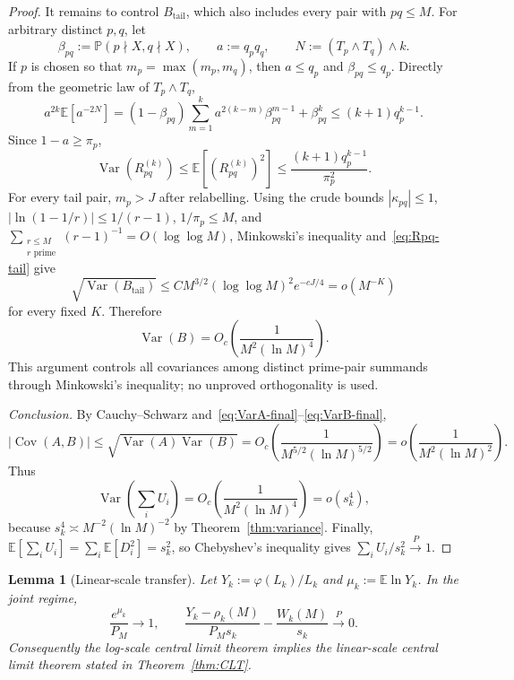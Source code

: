 \documentclass[11pt]{article}
\newtheorem{lemma}[theorem]{Lemma}
\theoremstyle{remark}
\newcommand{\PP}{\mathbb{P}}
\newcommand{\EE}{\mathbb{E}}
\DeclareMathOperator{\Var}{Var}
\DeclareMathOperator{\Cov}{Cov}
\begin{document}
\begin{proof}
It remains to control $B_{\mathrm{tail}}$, which also includes every pair with $pq\leq M$. For arbitrary distinct $p,q$, let
\[
\beta_{pq}:=\PP(p\nmid X,q\nmid X),\qquad a:=q_pq_q,
\qquad N:=(T_p\wedge T_q)\wedge k.
\]
If $p$ is chosen so that $m_p=\max(m_p,m_q)$, then $a\leq q_p$ and $\beta_{pq}\leq q_p$. Directly from the geometric law of $T_p\wedge T_q$,
\[
a^{2k}\EE[a^{-2N}]
=(1-\beta_{pq})\sum_{m=1}^k a^{2(k-m)}\beta_{pq}^{m-1}+\beta_{pq}^k
\leq (k+1)q_p^{k-1}.
\]
Since $1-a\geq\pi_p$,
\begin{equation}\label{eq:Rpq-tail}
\Var(R_{pq}^{(k)})
\leq \EE[(R_{pq}^{(k)})^2]
\leq \frac{(k+1)q_p^{k-1}}{\pi_p^2}.
\end{equation}
For every tail pair, $m_p>J$ after relabelling. Using the crude bounds $|\kappa_{pq}|\leq1$, $|\ln(1-1/r)|\leq1/(r-1)$, $1/\pi_p\leq M$, and $\sum_{\substack{r\leq M\\ r\text{ prime}}}(r-1)^{-1}=O(\log\log M)$, Minkowski's inequality and~\eqref{eq:Rpq-tail} give
\[
\sqrt{\Var(B_{\mathrm{tail}})}
\leq C M^{3/2}(\log\log M)^2e^{-cJ/4}
=o(M^{-K})
\]
for every fixed $K$. Therefore
\begin{equation}\label{eq:VarB-final}
\Var(B)=O_c\!\left(\frac{1}{M^2(\ln M)^4}\right).
\end{equation}
This argument controls all covariances among distinct prime-pair summands through Minkowski's inequality; no unproved orthogonality is used.

\textit{Conclusion.}
By Cauchy--Schwarz and~\eqref{eq:VarA-final}--\eqref{eq:VarB-final},
\[
|\Cov(A,B)|
\leq \sqrt{\Var(A)\Var(B)}
=O_c\!\left(\frac{1}{M^{5/2}(\ln M)^{5/2}}\right)
=o\!\left(\frac{1}{M^2(\ln M)^2}\right).
\]
Thus
\[
\Var\!\left(\sum_iU_i\right)
=O_c\!\left(\frac{1}{M^2(\ln M)^4}\right)
=o(s_k^4),
\]
because $s_k^4\asymp M^{-2}(\ln M)^{-2}$ by Theorem~\ref{thm:variance}. Finally,
$\EE[\sum_iU_i]=\sum_i\EE[D_i^2]=s_k^2$, so Chebyshev's inequality gives $\sum_iU_i/s_k^2\xrightarrow{P}1$.
\end{proof}

\begin{lemma}[Linear-scale transfer]\label{lem:linear-transfer}
Let $Y_k:=\varphi(L_k)/L_k$ and $\mu_k:=\EE\ln Y_k$. In the joint regime,
\[
\frac{e^{\mu_k}}{P_M}\longrightarrow1,
\qquad
\frac{Y_k-\rho_k(M)}{P_Ms_k}-\frac{W_k(M)}{s_k}\xrightarrow{P}0.
\]
Consequently the log-scale central limit theorem implies the linear-scale central limit theorem stated in Theorem~\ref{thm:CLT}.
\end{lemma}
\end{document}
